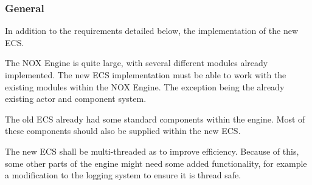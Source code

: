 \subsubsection*{General}
In addition to the requirements detailed below, the implementation of the new ECS. 

The NOX Engine is quite large, with several different modules already implemented. 
The new ECS implementation must be able to work with the existing modules within the NOX Engine. 
The exception being the already existing actor and component system.

The old ECS already had some standard components within the engine. 
Most of these components should also be supplied within the new ECS.

The new ECS shall be multi-threaded as to improve efficiency.
Because of this, 
some other parts of the engine might need some added functionality, 
for example a modification to the logging system to ensure it is thread safe.